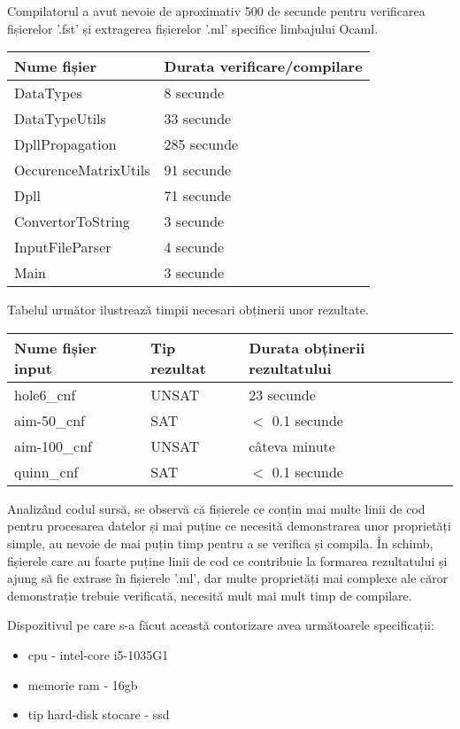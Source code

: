 Compilatorul a avut nevoie de aproximativ 500 de secunde pentru verificarea fișierelor '.fst' și extragerea fișierelor '.ml' specifice limbajului Ocaml. 
\newline
\begin{center}

\begin{tabular}{|l|l|} \hline
	Nume fișier & Durata verificare/compilare \\\hline
	DataTypes & 8 secunde \\\hline
	DataTypeUtils & 33 secunde \\\hline
	DpllPropagation & 285 secunde \\\hline
	OccurenceMatrixUtils & 91 secunde \\\hline
	Dpll & 71 secunde \\\hline
	ConvertorToString & 3 secunde \\\hline
	InputFileParser & 4 secunde \\\hline
	Main & 3 secunde \\\hline	
\end{tabular}
\end{center}

Tabelul următor ilustrează timpii necesari obținerii unor rezultate.
\begin{center}
\begin{tabular}{|l|l|l|} \hline
	Nume fișier input & Tip rezultat & Durata obținerii rezultatului \\\hline
	hole6\_cnf & UNSAT & 23 secunde \\\hline
	aim-50\_cnf & SAT & $<$ 0.1 secunde \\\hline
	aim-100\_cnf & UNSAT & câteva minute \\\hline
	quinn\_cnf & SAT & $<$ 0.1 secunde \\\hline

\end{tabular}
\end{center}

Analizând codul sursă, se observă că fișierele ce conțin mai multe linii de cod pentru procesarea datelor și mai puține ce necesită demonstrarea unor proprietăți simple, au nevoie de mai puțin timp pentru a se verifica și compila. În schimb, fișierele care au foarte puține linii de cod ce contribuie la formarea rezultatului și ajung să fie extrase în fișierele '.ml', dar multe proprietăți mai complexe ale căror demonstrație trebuie verificată, necesită mult mai mult timp de compilare.
\newpage

Dispozitivul pe care s-a făcut această contorizare avea următoarele specificații:
\begin{itemize}
	\item cpu - intel-core i5-1035G1
	\item memorie ram - 16gb
	\item tip hard-disk stocare - ssd
\end{itemize}



